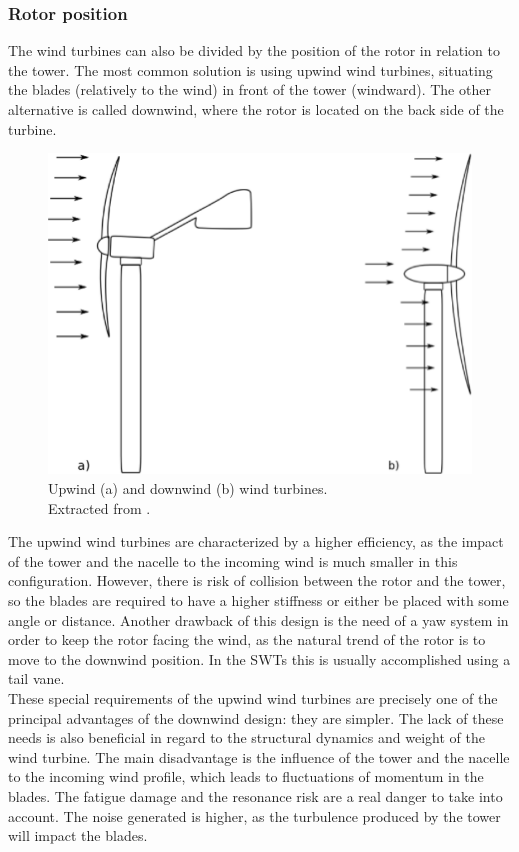 \documentclass[../TFG_Report.tex]{subfiles}
\begin{document}
\subsubsection{Rotor position}

The wind turbines can also be divided by the position of the rotor in relation to the tower. The most common solution is using upwind wind turbines, situating the blades (relatively to the wind) in front of the tower (windward). The other alternative is called downwind, where the rotor is located on the back side of the turbine. \\

\begin{figure}[h!]
	\centering
	\includegraphics[width=0.4\linewidth]{Images/Upwind-a-and-downwind-b-wind-turbines}
	\caption[Upwind and downwind wind turbines]{Upwind (a) and downwind (b) wind turbines. \\ Extracted from \cite{DesignControl}.}
	\label{fig:upwind-a-and-downwind-b-wind-turbines}
\end{figure}


The upwind wind turbines are characterized by a higher efficiency, as the impact of the tower and the nacelle to the incoming wind is much smaller in this configuration. However, there is risk of collision between the rotor and the tower, so the blades are required to have a higher stiffness or either be placed with some angle or distance. Another drawback of this design is the need of a yaw system in order to keep the rotor facing the wind, as the natural trend of the rotor is to move to the downwind position. In the SWTs this is usually accomplished using a tail vane.   \\

These special requirements of the upwind wind turbines are precisely one of the principal advantages of the downwind design: they are simpler. The lack of these needs is also beneficial in regard to the structural dynamics and weight of the wind turbine. The main disadvantage is the influence of the tower and the nacelle to the incoming wind profile, which leads to fluctuations of momentum in the blades. The fatigue damage and the resonance risk are a real danger to take into account. The noise generated is higher, as the turbulence produced by the tower will impact the blades. \cite{DesignControl}
\end{document}
